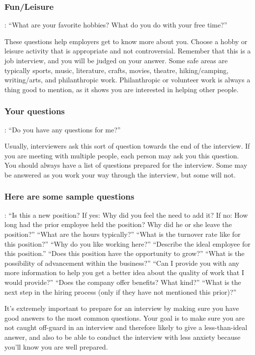 \subsubsection*{Fun/Leisure}:
\break ``What are your favorite hobbies? What do you do with your free time?''

These questions help employers get to know more about you. Choose a hobby or leisure activity that is appropriate and not controversial. Remember that this is a job interview, and you will be judged on your answer. Some safe areas are typically sports, music, literature, crafts, movies, theatre, hiking/camping, writing/arts, and philanthropic work. Philanthropic or volunteer work is always a thing good to mention, as it shows you are interested in helping other people.

\subsubsection*{Your questions}: ``Do you have any questions for me?''

Usually, interviewers ask this sort of question towards the end of the interview. If you are meeting with multiple people, each person may ask you this question. You should always have a list of questions prepared for the interview. Some may be answered as you work your way through the interview, but some will not.

\subsubsection*{Here are some sample questions}:
\break ``Is this a new position? If yes: Why did you feel the need to add it? If no: How long had the prior employee held the position? Why did he or she leave the position?''
\break ``What are the hours typically?''
\break ``What is the turnover rate like for this position?''
\break ``Why do you like working here?''
\break ``Describe the ideal employee for this position.''
\break ``Does this position have the opportunity to grow?''
\break ``What is the possibility of advancement within the business?''
\break ``Can I provide you with any more information to help you get a better idea about the quality of work that I would provide?''
\break ``Does the company offer benefits? What kind?''
\break ``What is the next step in the hiring process (only if they have not mentioned this prior)?''

It's extremely important to prepare for an interview by making sure you have good answers to the most common questions. Your goal is to make sure you are not caught off-guard in an interview and therefore likely to give a less-than-ideal answer, and also to be able to conduct the interview with less anxiety because you'll know you are well prepared.


